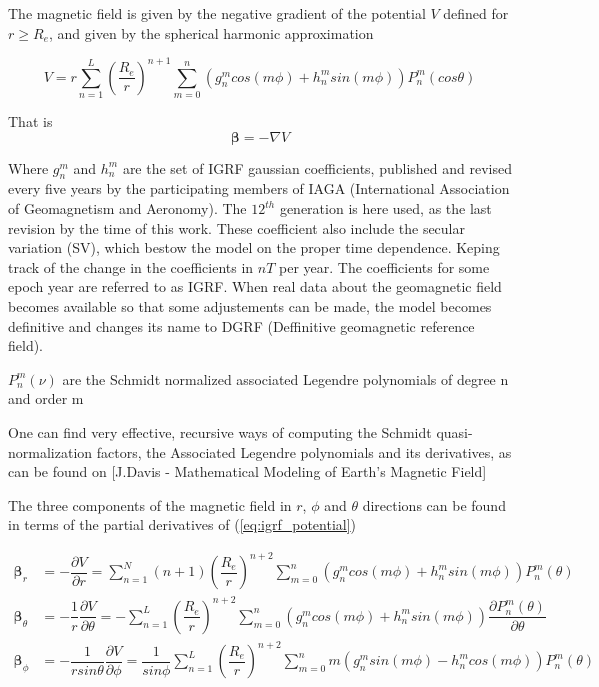 The magnetic field is given by the negative gradient of the potential $V$ defined for $r \geq R_e$, and given by the spherical harmonic approximation

\begin{equation} \label{eq:igrf_potential}
V = r \sum_{n=1}^{L} \left(\dfrac{R_e}{r}\right)^{n+1} \sum_{m=0}^{n} \left(g_n^m cos(m\phi) + h_n^m sin(m\phi)\right) P_n^m(cos\theta)
\end{equation}

That is
\begin{equation}
{\bm \beta} = -\nabla V
\end{equation}

Where $g_n^m$ and $h_n^m$ are the set of IGRF gaussian coefficients, published and revised every five years by the participating members of IAGA (International Association
of Geomagnetism and Aeronomy). The $12^{th}$ generation is here used, as the last revision by the time of this work. These coefficient also include the secular variation (SV), which bestow the model on the proper time dependence. Keping track of the change in the coefficients in $nT$ per year. The coefficients  for some epoch year are referred to as IGRF. When real data about the geomagnetic field becomes available so that some adjustements can be made, the model becomes definitive and changes its name to DGRF (Deffinitive geomagnetic reference field).

$P_n^m(\nu)$ are the Schmidt normalized associated Legendre polynomials of degree n and order m

One can find very effective, recursive ways of computing the Schmidt quasi-normalization factors, the Associated Legendre polynomials and its derivatives, as can be found on [J.Davis - Mathematical Modeling of Earth’s Magnetic Field] %

The three components of the magnetic field in $r$, $\phi$ and $\theta$ directions can be found in terms of the partial derivatives of (\ref{eq:igrf_potential})


\begin{equation} \label{eq:local_sph_cpmt}
\begin{aligned}
{\bm \beta}_r &= -\dfrac{\partial V}{\partial r} = \sum_{n=1}^{N} (n+1) \left(\dfrac{R_e}{r}\right)^{n+2} \sum_{m=0}^{n} \left(g_n^m cos(m\phi) + h_n^m sin(m\phi)\right) P_n^m(\theta)\\
{\bm \beta}_{\theta} &= -\dfrac{1}{r} \dfrac{\partial V}{\partial \theta} = 
-\sum_{n=1}^{L} \left(\dfrac{R_e}{r}\right)^{n+2} \sum_{m=0}^{n} \left(g_n^m cos(m\phi) + h_n^m sin(m\phi)\right) \dfrac{\partial P_n^m(\theta)}{\partial \theta}\\
{\bm \beta}_{\phi} &= -\dfrac{1}{r sin\theta} \dfrac{\partial V}{\partial \phi} = 
\dfrac{1}{sin\phi}\sum_{n=1}^{L} \left(\dfrac{R_e}{r}\right)^{n+2} \sum_{m=0}^{n} m\left(g_n^m sin(m\phi) - h_n^m cos(m\phi)\right) P_n^m(\theta)
\end{aligned}
\end{equation}


